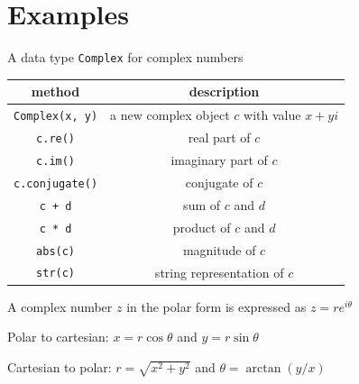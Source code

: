 \documentclass[8pt,a4paper,compress]{beamer}
\begin{document}
\section{Examples}
\begin{frame}[fragile]
\pause

A data type \lstinline{Complex} for complex numbers
\begin{center}
\begin{tabular}{cc}
method & description \\ \hline
\lstinline$Complex(x, y)$ & a new complex object $c$ with value $x + yi$ \\
\lstinline$c.re()$ & real part of $c$ \\
\lstinline$c.im()$ & imaginary part of $c$ \\
\lstinline$c.conjugate()$ & conjugate of $c$ \\
\lstinline$c + d$ & sum of $c$ and $d$ \\
\lstinline$c * d$ & product of $c$ and $d$ \\
\lstinline$abs(c)$ & magnitude of $c$ \\
\lstinline$str(c)$ & string representation of $c$
\end{tabular} 
\end{center}

\pause
\bigskip

\begin{minipage}{200pt}
A complex number $z$ in the polar form is expressed as $z = re^{i\theta}$

\bigskip

Polar to cartesian: $x = r\cos \theta$ and $y = r\sin \theta$

\bigskip

Cartesian to polar: $r = \sqrt{x^2 + y^2}$ and $\theta = \arctan(y/x)$

\bigskip


\end{minipage}
\end{frame}
\end{document}
